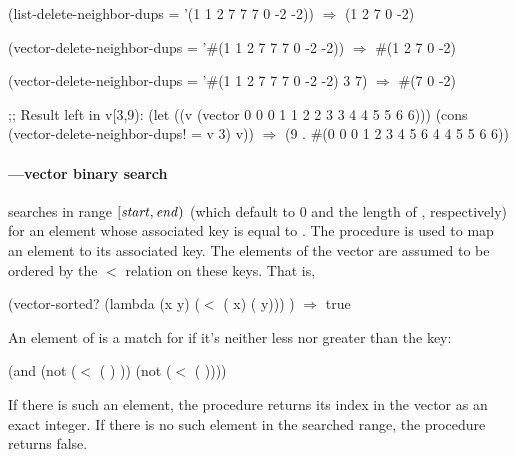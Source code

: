\begin{example}
(list-delete-neighbor-dups = '(1 1 2 7 7 7 0 -2 -2))
  \(\Longrightarrow\) (1 2 7 0 -2)

(vector-delete-neighbor-dups = '\#(1 1 2 7 7 7 0 -2 -2))
  \(\Longrightarrow\) \#(1 2 7 0 -2)

(vector-delete-neighbor-dups = '\#(1 1 2 7 7 7 0 -2 -2) 3 7)
  \(\Longrightarrow\) \#(7 0 -2)

;; Result left in v[3,9):
(let ((v (vector 0 0 0 1 1 2 2 3 3 4 4 5 5 6 6)))
  (cons (vector-delete-neighbor-dups! = v 3)
        v))
   \(\Longrightarrow\) (9 . \#(0 0 0 1 2 3 4 5 6 4 4 5 5 6 6))
\end{example}

\paragraph{---vector binary search}

\begin{protos}
\end{protos}

 searches  in range
\([\textnormal{\textit{start}},\textnormal{\textit{end}})\) (which default to 0 and the length of
, respectively) for an element whose
associated key is equal to . The procedure  is used to map
an element to its associated key. The elements of the vector are assumed
to be ordered by the $<$ relation on these keys. That is, 

\begin{example}
(vector-sorted? (lambda (x y) (\(<\) ( x) ( y)))
                  ) \(\Longrightarrow\) true
\end{example}

An element  of  is a match for  if it's
neither less nor greater than the key:

\begin{example}
(and (not (\(<\) ( ) ))
     (not (\(<\)  ( ))))
\end{example}

If there is such an element, the procedure returns its index in the
vector as an exact integer. If there is no such element in the searched 
range, the procedure returns false.

